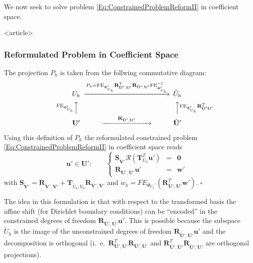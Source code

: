 We now seek to solve problem
\eqref{Eq:ConstrainedProblemReformII} in coefficient space. 

\begin{frame}<article>
\frametitle<presentation>{Reformulated Problem in Coefficient Space}
The projection $P_h$ is taken from the follwing commutative diagram:
\begin{equation*}
\begin{CD}
U_h @>{P_h = \text{FE}_{\Phi'_{U_h}}
\mathbf{R}^T_{\tilde{\mathbf{U}}',\mathbf{U}'}
\mathbf{R}_{\tilde{\mathbf{U}}',\mathbf{U}'} 
\text{FE}_{\Phi'_{U_h}}^{-1}}>> \tilde{U}_h\\
@A{\text{FE}_{\Phi'_{U_h}}}AA @AA{\text{FE}_{\Phi'_{U_h}}
\mathbf{R}^T_{\tilde{\mathbf{U}}'\mathbf{U}'}}A\\
\mathbf{U}' @>{\qquad\mathbf{R}_{\tilde{\mathbf{U}}',\mathbf{U}'}\qquad}>> \tilde{\mathbf{U}}' 
\end{CD}
\end{equation*}

\begin{Prp}
Using this definition of $P_h$ the reformulated constrained
problem \eqref{Eq:ConstrainedProblemReformII} in coefficient space reads
\begin{equation}\label{Eq:ConstrainedProblemInCoefficientSpace}
\mathbf{u}'\in\mathbf{U}' : \qquad \left\{\begin{array}{rcl}
\mathbf{S}_{\tilde{\mathbf{V}}'}
\mathcal{R}\left(\mathbf{T}^T_{U_h}\mathbf{u}'\right)
& = & \mathbf{0}\\
\mathbf{R}_{\bar{\mathbf{U}}',\mathbf{U}'} \mathbf{u}' & = & \mathbf{w}'
\end{array}\right.
\end{equation}
with $\mathbf{S}_{\tilde{\mathbf{V}}'}=\mathbf{R}_{\tilde{\mathbf{V}}',\mathbf{V}'} +
\mathbf{T}_{\tilde{V}_h,\bar{V}_h}\mathbf{R}_{\bar{\mathbf{V}}',\mathbf{V}'}$
and $w_h =
FE_{\Phi_{U_h}'}(\mathbf{R}_{\bar{\mathbf{U}}',\mathbf{U}'}^T\mathbf{w}')$.
\hfill$\square$
\end{Prp}
\end{frame}

The idea in this formulation is that with respect to the transformed
basis the affine shift (for Dirichlet boundary conditions) can be
``encoded'' in the constrained degrees of freedom
$\mathbf{R}_{\bar{\mathbf{U}}',\mathbf{U}'} \mathbf{u}'$. This is
possible because the subspace $\tilde{U}_h$ is the image
of the unconstrained degrees of freedom
$\mathbf{R}_{\tilde{\mathbf{U}}',\mathbf{U}'} \mathbf{u}'$ 
and the decomposition is orthogonal
(i.~e.~$\mathbf{R}^T_{\bar{\mathbf{U}}',\mathbf{U}'}
\mathbf{R}_{\bar{\mathbf{U}}',\mathbf{U}'}$ and
$\mathbf{R}^T_{\tilde{\mathbf{U}}',\mathbf{U}'}
\mathbf{R}_{\tilde{\mathbf{U}}',\mathbf{U}'}$ are orthogonal
projections). 


